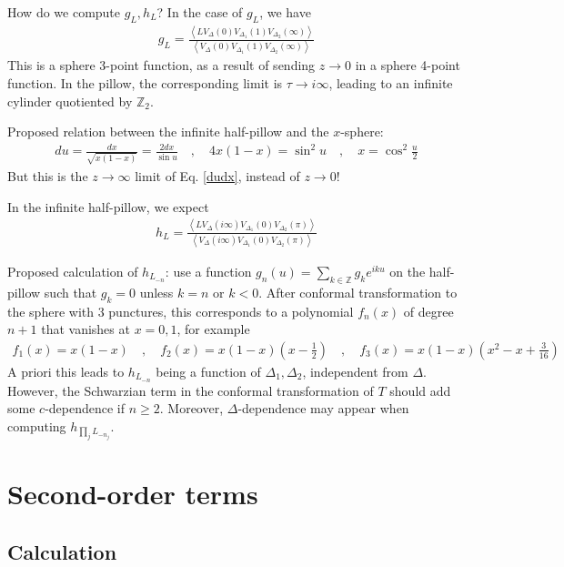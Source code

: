 \documentclass[12pt,a4paper]{article}
\begin{document}
How do we compute $g_L,h_L$? In the case of $g_L$, we have 
\begin{align}
 g_L = \frac{\left< LV_{\Delta}(0)V_{\Delta_1}(1)V_{\Delta_2}(\infty)\right>}{\left< V_{\Delta}(0)V_{\Delta_1}(1)V_{\Delta_2}(\infty)\right>}
\end{align}
This is a sphere 3-point function, as a result of sending $z\to 0$ in a sphere 4-point function. In the pillow, the corresponding limit is $\tau\to i\infty$, leading to an infinite cylinder quotiented by $\mathbb{Z}_2$. 

Proposed relation between the infinite half-pillow and the $x$-sphere:
\begin{align}
 du = \frac{dx}{\sqrt{x(1-x)}} = \frac{2dx}{\sin u} \quad , \quad 4x(1-x) = \sin^2u \quad , \quad x = \cos^2\tfrac{u}{2}
\end{align}
But this is the $z\to\infty$ limit of Eq. \eqref{dudx}, instead of $z\to 0$! 

In the infinite half-pillow, we expect
\begin{align}
 h_L = \frac{\left< LV_{\Delta}(i\infty)V_{\Delta_1}(0)V_{\Delta_2}(\pi)\right>}{\left< V_{\Delta}(i\infty)V_{\Delta_1}(0)V_{\Delta_2}(\pi)\right>}
\end{align}

Proposed calculation of $h_{L_{-n}}$: use a function $g_n(u)=\sum_{k\in\mathbb{Z}}g_k e^{iku} $ on the half-pillow such that $g_k=0$ unless $k=n$ or $k<0$. After conformal transformation to the sphere with 3 punctures, this corresponds to a polynomial $f_n(x)$ of degree $n+1$ that vanishes at $x=0,1$, for example 
\begin{align}
 f_1(x) = x(1-x) \quad , \quad f_2(x) = x(1-x)\left(x-\tfrac12\right) \quad ,\quad f_3(x) = x(1-x)\left(x^2-x+\tfrac{3}{16}\right)
\end{align}
A priori this leads to $h_{L_{-n}}$ being a function of $\Delta_1,\Delta_2$, independent from $\Delta$.
However, the Schwarzian term in the conformal transformation of $T$ should add some $c$-dependence if $n\geq 2$. Moreover, $\Delta$-dependence may appear when computing $h_{\prod_j L_{-n_j}}$. 

\section{Second-order terms}

\subsection{Calculation}
\end{document}
